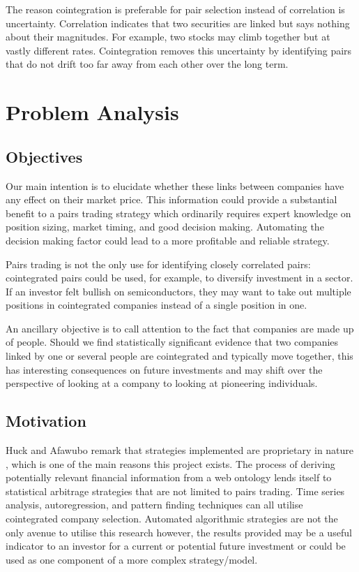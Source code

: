 \documentclass{UoYCSproject}
\begin{document}
The reason cointegration is preferable for pair selection instead of correlation is uncertainty. Correlation indicates that two securities are linked but says nothing about their magnitudes. For example, two stocks may climb together but at vastly different rates. Cointegration removes this uncertainty by identifying pairs that do not drift too far away from each other over the long term.

\chapter{Problem Analysis}
\label{cha:Problem Analysis}

\section{Objectives}

Our main intention is to elucidate whether these links between companies have any effect on their market price. This information could provide a substantial benefit to a pairs trading strategy which ordinarily requires expert knowledge on position sizing, market timing, and good decision making. Automating the decision making factor could lead to a more profitable and reliable strategy.

Pairs trading is not the only use for identifying closely correlated pairs: cointegrated pairs could be used, for example, to diversify investment in a sector. If an investor felt bullish on semiconductors, they may want to take out multiple positions in cointegrated companies instead of a single position in one.

An ancillary objective is to call attention to the fact that companies are made up of people. Should we find statistically significant evidence that two companies linked by one or several people are cointegrated and typically move together, this has interesting consequences on future investments and may shift over the perspective of looking at a company to looking at pioneering individuals. 

\section{Motivation}

Huck and Afawubo remark that strategies implemented are proprietary in nature \parencite{cointsupport}, which is one of the main reasons this project exists. The process of deriving potentially relevant financial information from a web ontology lends itself to statistical arbitrage strategies that are not limited to pairs trading. Time series analysis, autoregression, and pattern finding techniques can all utilise cointegrated company selection. Automated algorithmic strategies are not the only avenue to utilise this research however, the results provided may be a useful indicator to an investor for a current or potential future investment or could be used as one component of a more complex strategy/model.
\end{document}
